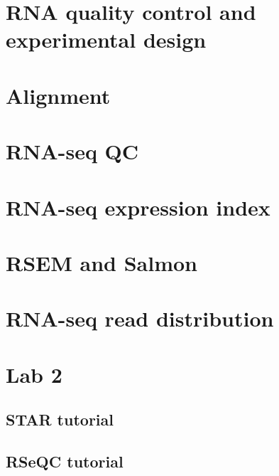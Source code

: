 \documentclass[
]{book}
\begin{document}
\hypertarget{rna-quality-control-and-experimental-design}{%
\section{RNA quality control and experimental design}\label{rna-quality-control-and-experimental-design}}

\hypertarget{alignment}{%
\section{Alignment}\label{alignment}}

\hypertarget{rna-seq-qc}{%
\section{RNA-seq QC}\label{rna-seq-qc}}

\hypertarget{rna-seq-expression-index}{%
\section{RNA-seq expression index}\label{rna-seq-expression-index}}

\hypertarget{rsem-and-salmon}{%
\section{RSEM and Salmon}\label{rsem-and-salmon}}

\hypertarget{rna-seq-read-distribution}{%
\section{RNA-seq read distribution}\label{rna-seq-read-distribution}}

\hypertarget{lab-2}{%
\section{Lab 2}\label{lab-2}}

\hypertarget{star-tutorial}{%
\subsection{STAR tutorial}\label{star-tutorial}}

\hypertarget{rseqc-tutorial}{%
\subsection{RSeQC tutorial}\label{rseqc-tutorial}}
\end{document}

